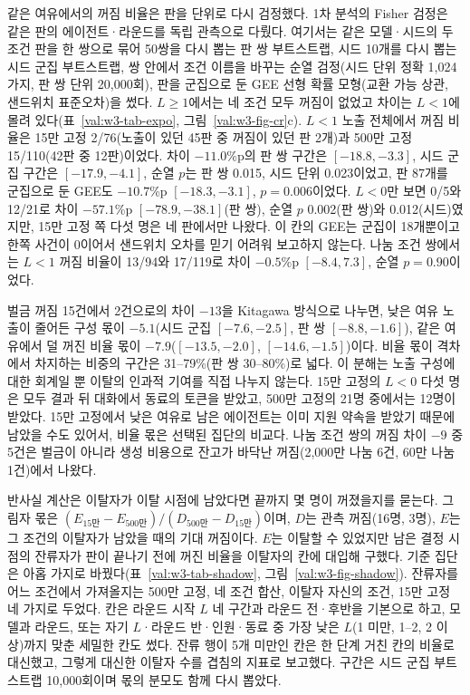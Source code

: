같은 여유에서의 꺼짐 비율은 판을 단위로 다시 검정했다. 1차 분석의 Fisher 검정은 같은 판의 에이전트·라운드를 독립 관측으로 다뤘다. 여기서는 같은 모델·시드의 두 조건 판을 한 쌍으로 묶어 50쌍을 다시 뽑는 판 쌍 부트스트랩, 시드 10개를 다시 뽑는 시드 군집 부트스트랩, 쌍 안에서 조건 이름을 바꾸는 순열 검정(시드 단위 정확 1,024가지, 판 쌍 단위 20,000회), 판을 군집으로 둔 GEE 선형 확률 모형(교환 가능 상관, 샌드위치 표준오차)을 썼다. $L\geq1$에서는 네 조건 모두 꺼짐이 없었고 차이는 $L<1$에 몰려 있다(표~\ref{val:w3-tab-expo}, 그림~\ref{val:w3-fig-cr}c). $L<1$ 노출 전체에서 꺼짐 비율은 15만 고정 2/76(노출이 있던 45판 중 꺼짐이 있던 판 2개)과 500만 고정 15/110(42판 중 12판)이었다. 차이 $-11.0$\%p의 판 쌍 구간은 $[-18.8, -3.3]$, 시드 군집 구간은 $[-17.9, -4.1]$, 순열 $p$는 판 쌍 0.015, 시드 단위 0.023이었고, 판 87개를 군집으로 둔 GEE도 $-10.7$\%p $[-18.3, -3.1]$, $p=0.006$이었다. $L<0$만 보면 0/5와 12/21로 차이 $-57.1$\%p $[-78.9, -38.1]$(판 쌍), 순열 $p$ 0.002(판 쌍)와 0.012(시드)였지만, 15만 고정 쪽 다섯 명은 네 판에서만 나왔다. 이 칸의 GEE는 군집이 18개뿐이고 한쪽 사건이 0이어서 샌드위치 오차를 믿기 어려워 보고하지 않는다. 나눔 조건 쌍에서는 $L<1$ 꺼짐 비율이 13/94와 17/119로 차이 $-0.5$\%p $[-8.4, 7.3]$, 순열 $p=0.90$이었다.

벌금 꺼짐 15건에서 2건으로의 차이 $-13$을 Kitagawa 방식으로 나누면, 낮은 여유 노출이 줄어든 구성 몫이 $-5.1$(시드 군집 $[-7.6, -2.5]$, 판 쌍 $[-8.8, -1.6]$), 같은 여유에서 덜 꺼진 비율 몫이 $-7.9$($[-13.5, -2.0]$, $[-14.6, -1.5]$)이다. 비율 몫이 격차에서 차지하는 비중의 구간은 31--79\%(판 쌍 30--80\%)로 넓다. 이 분해는 노출 구성에 대한 회계일 뿐 이탈의 인과적 기여를 직접 나누지 않는다. 15만 고정의 $L<0$ 다섯 명은 모두 결과 뒤 대화에서 동료의 토큰을 받았고, 500만 고정의 21명 중에서는 12명이 받았다. 15만 고정에서 낮은 여유로 남은 에이전트는 이미 지원 약속을 받았기 때문에 남았을 수도 있어서, 비율 몫은 선택된 집단의 비교다. 나눔 조건 쌍의 꺼짐 차이 $-9$ 중 5건은 벌금이 아니라 생성 비용으로 잔고가 바닥난 꺼짐(2,000만 나눔 6건, 60만 나눔 1건)에서 나왔다.

반사실 계산은 이탈자가 이탈 시점에 남았다면 끝까지 몇 명이 꺼졌을지를 묻는다. 그림자 몫은 $(E_{15\text{만}}-E_{500\text{만}})/(D_{500\text{만}}-D_{15\text{만}})$이며, $D$는 관측 꺼짐(16명, 3명), $E$는 그 조건의 이탈자가 남았을 때의 기대 꺼짐이다. $E$는 이탈할 수 있었지만 남은 결정 시점의 잔류자가 판이 끝나기 전에 꺼진 비율을 이탈자의 칸에 대입해 구했다. 기준 집단은 아홉 가지로 바꿨다(표~\ref{val:w3-tab-shadow}, 그림~\ref{val:w3-fig-shadow}). 잔류자를 어느 조건에서 가져올지는 500만 고정, 네 조건 합산, 이탈자 자신의 조건, 15만 고정 네 가지로 두었다. 칸은 라운드 시작 $L$ 네 구간과 라운드 전·후반을 기본으로 하고, 모델과 라운드, 또는 자기 $L$·라운드 반·인원·동료 중 가장 낮은 $L$(1 미만, 1--2, 2 이상)까지 맞춘 세밀한 칸도 썼다. 잔류 행이 5개 미만인 칸은 한 단계 거친 칸의 비율로 대신했고, 그렇게 대신한 이탈자 수를 겹침의 지표로 보고했다. 구간은 시드 군집 부트스트랩 10,000회이며 몫의 분모도 함께 다시 뽑았다.

